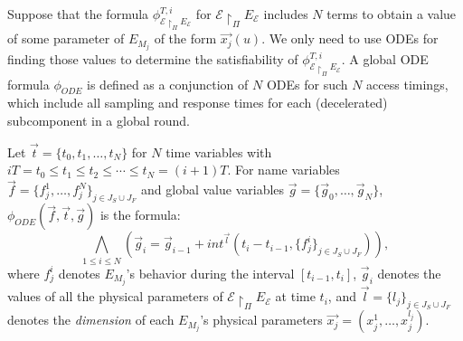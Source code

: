 Suppose that 
the formula $\phi_{\mathcal{E} \restriction_{\Pi} E_\mathcal{E}}^{T,i}$ for $\mathcal{E} \restriction_{\Pi} E_\mathcal{E}$
includes $N$ terms  to obtain a value of some parameter of $E_{M_j}$ of the form $\vec{x_j}(u)$.
We only need to use ODEs for finding those values %
to determine the satisfiability of $\phi_{\mathcal{E} \restriction_{\Pi} E_\mathcal{E}}^{T,i}$.
A global ODE formula $\phi_{\mathit{ODE}}$
is defined as a conjunction of $N$ ODEs for such $N$ access timings,
which include all sampling and response times for each (decelerated) subcomponent in a global round.

\begin{definition}
Let $\vec{t} = \{t_0,t_1,\ldots,t_N\}$ for  $N$ time variables with
$iT = t_0 \leq t_1 \leq t_2 \leq \cdots \leq t_N = (i+1)T$.
For name variables $\vec{f} = \{f_j^1,\ldots,f_j^N\}_{j \in J_S \cup J_F}$ and
global value variables $\vec{g} = \{\vec{g}_0,\ldots,\vec{g}_N\}$,
$\phi_{\mathit{ODE}}(\vec{f},\vec{t},\vec{g})$ is the %
formula:
\[
\bigwedge_{1 \leq i \leq N}
(
\vec{g}_{i} = \vec{g}_{i-1} + 
\mathit{int}^{\vec{l}}(t_{i} - t_{i-1}, \{f_j^i\}_{j \in J_S \cup J_F})
),
\]
where $f_j^i$ denotes $E_{M_j}$'s behavior during the interval $[t_{i-1},t_i]$,
$\vec{g}_i$ denotes the values of all the physical parameters of $\mathcal{E} \restriction_{\Pi} E_\mathcal{E}$
at time $t_i$, and $\vec{l} = \{l_j\}_{j \in J_S \cup J_F}$ denotes the \emph{dimension}
of each $E_{M_j}$'s physical parameters $\vec{x_j} = (x_j^1,\ldots,x_j^{l_j})$.
\end{definition}



